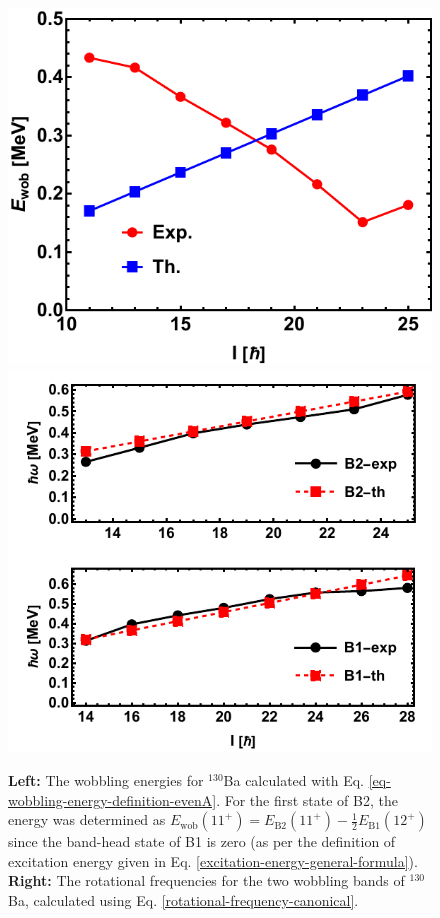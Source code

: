 \begin{figure}
    \centering
    \includegraphics[scale=0.73]{Chapters/Figures/ba130-wobbling-energies.pdf}
    \includegraphics[scale=0.7]{Chapters/Figures/ba130-rotational-frequencies.pdf}
    \caption{\textbf{Left:} The wobbling energies for $^{130}$Ba calculated with Eq. \ref{eq-wobbling-energy-definition-evenA}. For the first state of B2, the energy was determined as $E_\text{wob}(11^+)=E_\text{B2}(11^+)-\frac{1}{2}E_\text{B1}(12^+)$ since the band-head state of B1 is zero (as per the definition of excitation energy given in Eq. \ref{excitation-energy-general-formula}). \textbf{Right:} The rotational frequencies for the two wobbling bands of $^{130}$Ba, calculated using Eq. \ref{rotational-frequency-canonical}.}
    \label{wobbling-energies-130ba-expVSth}
\end{figure}

